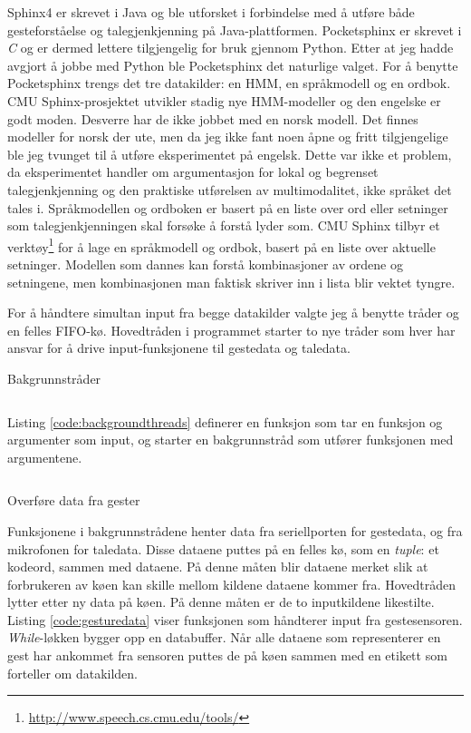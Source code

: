 Sphinx4 er skrevet i Java og ble utforsket i forbindelse med å utføre både gesteforståelse og talegjenkjenning på Java-plattformen. Pocketsphinx er skrevet i \emph{C} og er dermed lettere tilgjengelig for bruk gjennom Python. Etter at jeg hadde avgjort å jobbe med Python ble Pocketsphinx det naturlige valget. For å benytte Pocketsphinx trengs det tre datakilder: en HMM, en språkmodell og en ordbok. CMU Sphinx-prosjektet utvikler stadig nye HMM-modeller og den engelske er godt moden. Desverre har de ikke jobbet med en norsk modell. Det finnes modeller for norsk der ute, men da jeg ikke fant noen åpne og fritt tilgjengelige ble jeg tvunget til å utføre eksperimentet på engelsk. Dette var ikke et problem, da eksperimentet handler om argumentasjon for lokal og begrenset talegjenkjenning og den praktiske utførelsen av multimodalitet, ikke språket det tales i. Språkmodellen og ordboken er basert på en liste over ord eller setninger som talegjenkjenningen skal forsøke å forstå lyder som. CMU Sphinx tilbyr et verktøy\footnote{\url{http://www.speech.cs.cmu.edu/tools/}} for å lage en språkmodell og ordbok, basert på en liste over aktuelle setninger. Modellen som dannes kan forstå kombinasjoner av ordene og setningene, men kombinasjonen man faktisk skriver inn i lista blir vektet tyngre.

For å håndtere simultan input fra begge datakilder valgte jeg å benytte tråder og en felles FIFO-kø. Hovedtråden i programmet starter to nye tråder som hver har ansvar for å drive input-funksjonene til gestedata og taledata. 
\begin{listing}[ht]
\caption{Bakgrunnstråder}
\inputminted[fontsize=\footnotesize, linenos]{python}{kodesnutter/background_threads.py}
\label{code:backgroundthreads}
\end{listing}
Listing \ref{code:backgroundthreads} definerer en funksjon som tar en funksjon og argumenter som input, og starter en bakgrunnstråd som utfører funksjonen med argumentene.
\begin{listing}[ht]
\inputminted[fontsize=\footnotesize, linenos]{python}{kodesnutter/gesture_data.py}
\caption{Overføre data fra gester}
\label{code:gesturedata}
\end{listing}
Funksjonene i bakgrunnstrådene henter data fra seriellporten for gestedata, og fra mikrofonen for taledata. Disse dataene puttes på en felles kø, som en \emph{tuple}: et kodeord, sammen med dataene. På denne måten blir dataene merket slik at forbrukeren av køen kan skille mellom kildene dataene kommer fra. Hovedtråden lytter etter ny data på køen. På denne måten er de to inputkildene likestilte. Listing \ref{code:gesturedata} viser funksjonen som håndterer input fra gestesensoren. \emph{While}-løkken bygger opp en databuffer. Når alle dataene som representerer en gest har ankommet fra sensoren puttes de på køen sammen med en etikett som forteller om datakilden.

